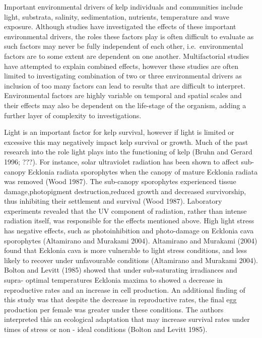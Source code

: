 \documentclass[
]{article}
\begin{document}
Important environmental drivers of kelp individuals and communities
include light, substrata, salinity, sedimentation, nutrients,
temperature and wave exposure. Although studies have investigated the
effects of these important environmental drivers, the roles these
factors play is often difficult to evaluate as such factors may never be
fully independent of each other, i.e.~environmental factors are to some
extent are dependent on one another. Multifactorial studies have
attempted to explain combined effects, however these studies are often
limited to investigating combination of two or three environmental
drivers as inclusion of too many factors can lead to results that are
difficult to interpret. Environmental factors are highly variable on
temporal and spatial scales and their effects may also be dependent on
the life-stage of the organism, adding a further layer of complexity to
investigations.

Light is an important factor for kelp survival, however if light is
limited or excessive this may negatively impact kelp survival or growth.
Much of the past research into the role light plays into the functioning
of kelp (Bruhn and Gerard 1996; ???). For instance, solar ultraviolet
radiation has been shown to affect sub-canopy Ecklonia radiata
sporophytes when the canopy of mature Ecklonia radiata was removed (Wood
1987). The sub-canopy sporophytes experienced tissue damage,photopigment
destruction,reduced growth and decreased survivorship, thus inhibiting
their settlement and survival (Wood 1987). Laboratory experiments
revealed that the UV component of radiation, rather than intense
radiation itself, was responsible for the effects mentioned above. High
light stress has negative effects, such as photoinhibition and
photo-damage on Ecklonia cava sporophytes (Altamirano and Murakami
2004). Altamirano and Murakami (2004) found that Ecklonia cava is more
vulnerable to light stress conditions, and less likely to recover under
unfavourable conditions (Altamirano and Murakami 2004). Bolton and
Levitt (1985) showed that under sub-saturating irradiances and supra-
optimal temperatures Ecklonia maxima to showed a decrease in
reproductive rates and an increase in cell production. An additional
finding of this study was that despite the decrease in reproductive
rates, the final egg production per female was greater under these
conditions. The authors interpreted this an ecological adaptation that
may increase survival rates under times of stress or non - ideal
conditions (Bolton and Levitt 1985).
\end{document}
